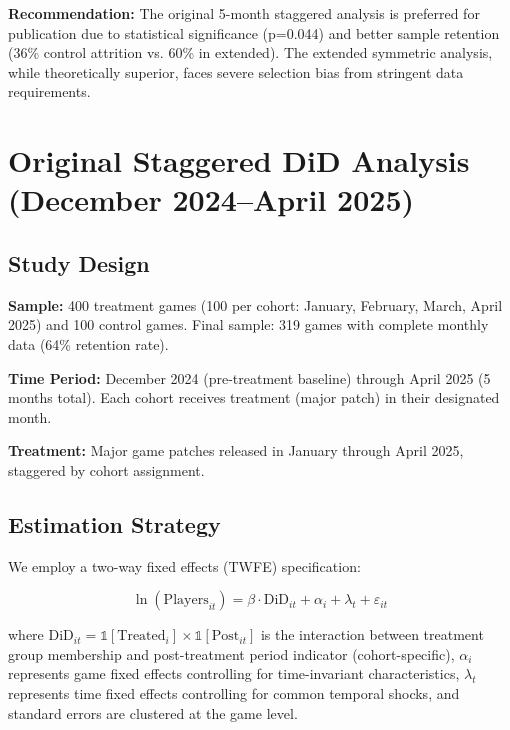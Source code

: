 \documentclass[12pt,a4paper]{article}
\begin{document}
\textbf{Recommendation:} The original 5-month staggered analysis is preferred for publication due to statistical significance (p=0.044) and better sample retention (36\% control attrition vs. 60\% in extended). The extended symmetric analysis, while theoretically superior, faces severe selection bias from stringent data requirements.

\clearpage

\section{Original Staggered DiD Analysis (December 2024--April 2025)}
\label{sec:original-staggered}

\subsection{Study Design}

\textbf{Sample:} 400 treatment games (100 per cohort: January, February, March, April 2025) and 100 control games. Final sample: 319 games with complete monthly data (64\% retention rate).

\textbf{Time Period:} December 2024 (pre-treatment baseline) through April 2025 (5 months total). Each cohort receives treatment (major patch) in their designated month.

\textbf{Treatment:} Major game patches released in January through April 2025, staggered by cohort assignment.

\subsection{Estimation Strategy}

We employ a two-way fixed effects (TWFE) specification:

\begin{equation}
\ln(\text{Players}_{it}) = \beta \cdot \text{DiD}_{it} + \alpha_i + \lambda_t + \varepsilon_{it}
\label{eq:original-twfe}
\end{equation}

\noindent where $\text{DiD}_{it} = \mathbb{1}[\text{Treated}_i] \times \mathbb{1}[\text{Post}_{it}]$ is the interaction between treatment group membership and post-treatment period indicator (cohort-specific), $\alpha_i$ represents game fixed effects controlling for time-invariant characteristics, $\lambda_t$ represents time fixed effects controlling for common temporal shocks, and standard errors are clustered at the game level.
\end{document}
